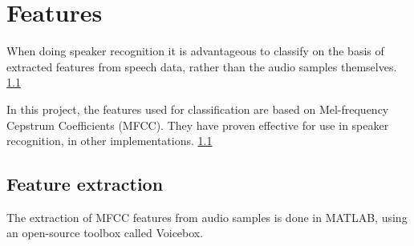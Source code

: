 \chapter{Features}

When doing speaker recognition it is advantageous to classify on the basis of extracted features from speech data, rather than the audio samples themselves. \ref{} %

In this project, the features used for classification are based on Mel-frequency Cepstrum Coefficients (MFCC).
They have proven effective for use in speaker recognition, in other implementations. \ref{} %


\section{Feature extraction}

The extraction of MFCC features from audio samples is done in MATLAB, using an open-source toolbox called Voicebox.
